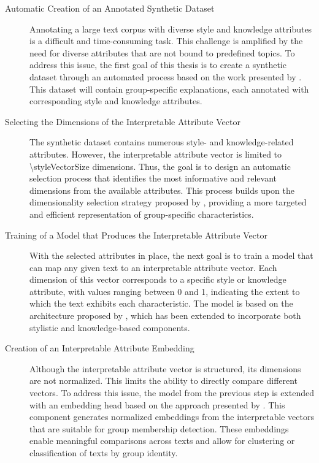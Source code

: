\begin{description}
      \item[Automatic Creation of an Annotated Synthetic Dataset]
            Annotating a large text corpus with diverse style and knowledge attributes is a difficult and time-consuming task. This challenge is amplified by the need for diverse attributes that are not bound to predefined topics. To address this issue, the first goal of this thesis is to create a synthetic dataset through an automated process based on the work presented by \citet{patelLearningInterpretableStyle2023}. This dataset will contain group-specific explanations, each annotated with corresponding style and knowledge attributes.

      \item[Selecting the Dimensions of the Interpretable Attribute Vector]\hspace{\maxstretch}
            The synthetic dataset contains numerous style- and knowledge-related attributes. However, the interpretable attribute vector is limited to \num{\styleVectorSize} dimensions. Thus, the goal is to design an automatic selection process that identifies the most informative and relevant dimensions from the available attributes. This process builds upon the dimensionality selection strategy proposed by \citet{patelLearningInterpretableStyle2023}, providing a more targeted and efficient representation of group-specific characteristics.

      \item[Training of a Model that Produces the Interpretable Attribute Vector]
            With the selected attributes in place, the next goal is to train a model that can map any given text to an interpretable attribute vector. Each dimension of this vector corresponds to a specific style or knowledge attribute, with values ranging between \num{0} and \num{1}, indicating the extent to which the text exhibits each characteristic. The model is based on the architecture proposed by \citet{patelLearningInterpretableStyle2023}, which has been extended to incorporate both stylistic and knowledge-based components.

      \item[Creation of an Interpretable Attribute Embedding]\hphantom{at}
            Although the interpretable attribute vector is structured, its dimensions are not normalized. This limits the ability to directly compare different vectors. To address this issue, the model from the previous step is extended with an embedding head based on the approach presented by \citet{patelLearningInterpretableStyle2023}. This component generates normalized embeddings from the interpretable vectors that are suitable for group membership detection. These embeddings enable meaningful comparisons across texts and allow for clustering or classification of texts by group identity.


\end{description}
